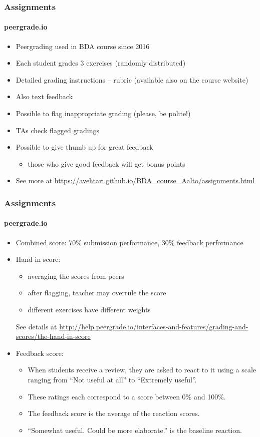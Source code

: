 \documentclass[english]{beamer}
\begin{document}
\begin{frame}
  \frametitle{Assignments}  %
  \framesubtitle{peergrade.io}
  \begin{itemize}
  \item Peergrading used in BDA course since 2016
  \item Each student grades 3 exercises (randomly distributed)
  \item Detailed grading instructions -- rubric (available also on the course website)
  \item Also text feedback
  \item Possible to flag inappropriate grading (please, be polite!)
  \item TAs check flagged gradings
  \item Possible to give thumb up for great feedback
    \begin{itemize}
    \item those who give good feedback will get bonus points
    \end{itemize}
  \item See more at
    \url{https://avehtari.github.io/BDA_course_Aalto/assignments.html}
  \end{itemize}
  
\end{frame}

\begin{frame}
  \frametitle{Assignments}  %
  \framesubtitle{peergrade.io}

  \begin{itemize}
  \item Combined score: 70\% submission performance, 30\% feedback performance
    \pause
  \item Hand-in score:
    \begin{itemize}
    \item averaging the scores from peers
    \item after flagging, teacher may overrule the score
    \item different exercises have different weights
    \end{itemize}
    See details at \url{http://help.peergrade.io/interfaces-and-features/grading-and-scores/the-hand-in-score}
    \pause
  \item Feedback score:
    \begin{itemize}
    \item When students receive a review, they are asked to react to
      it using a scale ranging from ``Not useful at all'' to ``Extremely
      useful''.
    \item These ratings each correspond to a score between 0\% and 100\%.
    \item The feedback score is the average of the reaction scores.
    \item ``Somewhat useful. Could be more elaborate.'' is the
      baseline reaction.
    \end{itemize}
    
  \end{itemize}
  
\end{frame}
\end{document}
